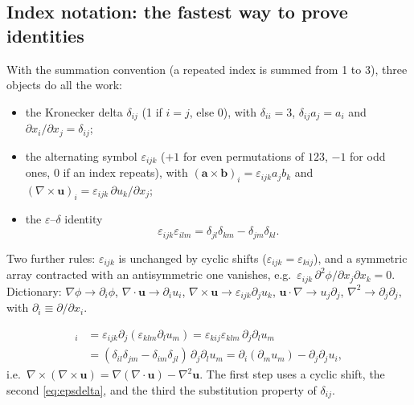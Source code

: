 \documentclass[11pt,letterpaper]{article}
\numberwithin{equation}{section}
\newcommand{\uu}{\mathbf{u}}
\begin{document}
\subsection{Index notation: the fastest way to prove identities}
With the summation convention (a repeated index is summed from 1 to 3), three objects do all the work:
\begin{itemize}
  \item the Kronecker delta $\delta_{ij}$ (1 if $i=j$, else 0), with $\delta_{ii}=3$, $\delta_{ij}a_j=a_i$ and
        $\partial x_i/\partial x_j=\delta_{ij}$;
  \item the alternating symbol $\varepsilon_{ijk}$ ($+1$ for even permutations of $123$, $-1$ for odd ones, $0$ if an
        index repeats), with $(\mathbf a\times\mathbf b)_i=\varepsilon_{ijk}a_jb_k$ and
        $(\nabla\times\uu)_i=\varepsilon_{ijk}\,\partial u_k/\partial x_j$;
  \item the $\varepsilon$--$\delta$ identity
        \begin{equation}\label{eq:epsdelta}
        \varepsilon_{ijk}\varepsilon_{ilm}=\delta_{jl}\delta_{km}-\delta_{jm}\delta_{kl}.
        \end{equation}
\end{itemize}
Two further rules: $\varepsilon_{ijk}$ is unchanged by cyclic shifts ($\varepsilon_{ijk}=\varepsilon_{kij}$), and a
symmetric array contracted with an antisymmetric one vanishes, e.g.\ $\varepsilon_{ijk}\,\partial^2\phi/\partial x_j\partial x_k=0$.
Dictionary: $\nabla\phi\to\partial_i\phi$, $\nabla\cdot\uu\to\partial_iu_i$, $\nabla\times\uu\to\varepsilon_{ijk}\partial_ju_k$,
$\uu\cdot\nabla\to u_j\partial_j$, $\nabla^2\to\partial_j\partial_j$, with $\partial_i\equiv\partial/\partial x_i$.

\begin{worked}\label{we:curlcurl}
\begin{align*}
[\nabla\times(\nabla\times\uu)]_i&=\varepsilon_{ijk}\partial_j(\varepsilon_{klm}\partial_lu_m)
=\varepsilon_{kij}\varepsilon_{klm}\,\partial_j\partial_lu_m\\
&=(\delta_{il}\delta_{jm}-\delta_{im}\delta_{jl})\,\partial_j\partial_lu_m
=\partial_i(\partial_mu_m)-\partial_j\partial_ju_i ,
\end{align*}
i.e.\ $\nabla\times(\nabla\times\uu)=\nabla(\nabla\cdot\uu)-\nabla^2\uu$. The first step uses a cyclic shift, the second
\eqref{eq:epsdelta}, and the third the substitution property of $\delta_{ij}$.
\end{worked}
\end{document}
